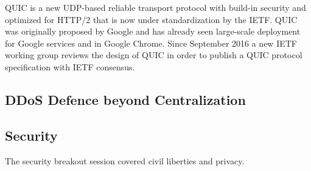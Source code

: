 QUIC is a new UDP-based reliable transport protocol with build-in security and
optimized for HTTP/2 that is now under standardization by the IETF. QUIC was
originally proposed by Google and has already seen large-scale deployment for
Google services and in Google Chrome. Since September 2016 a new IETF working
group reviews the design of QUIC in order to publish a QUIC protocol
specification \cite{draft-ietf-quic-transport} with IETF consensus.




\subsection{DDoS Defence beyond Centralization}

\subsection{Security}

The security breakout session covered civil liberties and privacy.

